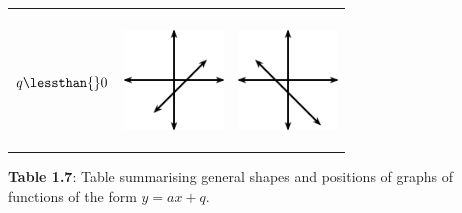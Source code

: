 \begin{center}
\begin{xtabular*}{\mytablewidth}[t]{|p{10\mystarwidth}|p{10\mystarwidth}|p{10\mystarwidth}|}
\begin{center}
\vspace{2pt}
\vspace{.1in}
\end{center}    
\tabularnewline{}
    $q\lessthan{}0$
    &
\setcounter{subfigure}{0}
\label{m39338*id238353}
\begin{center}
\label{m39338*id238353!!!underscore!!!media}\label{m39338*id238353!!!underscore!!!printimage}\includegraphics[width=100px]{col11306.imgs/m39338_MG10C11_008.png} %
\vspace{2pt}
\vspace{.1in}
\end{center}    
    &
\setcounter{subfigure}{0}
\label{m39338*id238365}
\begin{center}
\label{m39338*id238365!!!underscore!!!media}\label{m39338*id238365!!!underscore!!!printimage}\includegraphics[width=100px]{col11306.imgs/m39338_MG10C11_009.png} %
\vspace{2pt}
\vspace{.1in}
\end{center}    
\tabularnewline{}
\end{xtabular*}
\end{center}
\begin{center}{\small\bfseries Table 1.7}: Table summarising general shapes and positions of graphs of functions of the form $y=ax+q$.\end{center}
\par
